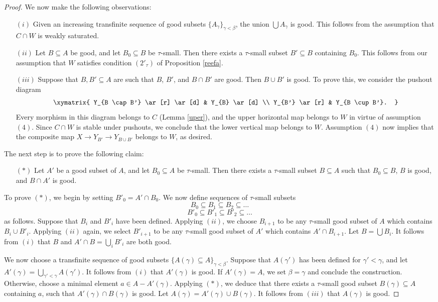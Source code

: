 \begin{Model Categories}
\begin{proof}
We now make the following observations:
\begin{itemize}
\item[$(i)$] Given an increasing transfinite sequence of good subsets $\{ A_{\gamma} \}_{\gamma < \beta}$,
the union $\bigcup A_{\gamma}$ is good. This follows from the assumption that $C \cap W$
is weakly saturated.
\item[$(ii)$] Let $B \subseteq A$ be good, and let $B_0 \subseteq B$ be $\tau$-small. Then there exists a $\tau$-small subset $B' \subseteq B$ containing $B_0$. This follows from our assumption
that $W$ satisfies condition $(2'_{\tau})$ of Proposition \ref{reefa}. 
\item[$(iii)$] Suppose that $B,B' \subseteq A$ are such that $B$, $B'$, and $B \cap B'$ are good.
Then $B \cup B'$ is good. To prove this, we consider the pushout diagram
$$ \xymatrix{ Y_{B \cap B'} \ar[r] \ar[d] & Y_{B} \ar[d] \\
Y_{B'} \ar[r] & Y_{B \cup B'}. }$$
Every morphism in this diagram belongs to $C$ (Lemma \ref{uper}), and the upper horizontal map belongs to $W$ in virtue of assumption $(4)$. Since $C \cap W$ is stable under pushouts, we conclude that the lower vertical map belongs to $W$. Assumption $(4)$ now implies that the composite map $X \rightarrow Y_{B'} \rightarrow Y_{B \cup B'}$ belongs to $W$, as desired.
\end{itemize}

The next step is to prove the following claim:
\begin{itemize}
\item[$(\ast)$] Let $A'$ be a good subset of $A$, and let $B_0 \subseteq A$ be $\tau$-small. Then
there exists a $\tau$-small subset $B \subseteq A$ such that $B_0 \subseteq B$, $B$ is good, and $B \cap A'$ is good.
\end{itemize}

To prove $(\ast)$, we begin by setting $B'_0 = A' \cap B_0$. We now define sequences of $\tau$-small subsets
$$ B_0 \subseteq B_1 \subseteq B_2 \subseteq \ldots $$
$$ B'_0 \subseteq B'_1 \subseteq B'_2 \subseteq \ldots$$
as follows. Suppose that $B_i$ and $B'_{i}$ have been defined. Applying $(ii)$, we choose
$B_{i+1}$ to be any $\tau$-small good subset of $A$ which contains $B_i \cup B'_{i}$.
Applying $(ii)$ again, we select $B'_{i+1}$ to be any $\tau$-small good subset of $A'$ which contains $A' \cap B_{i+1}$. Let $B = \bigcup B_{i}$. It follows from $(i)$ that $B$ and $A' \cap B = \bigcup_{i} B'_{i}$ are both good.

We now choose a transfinite sequence of good subsets $\{ A(\gamma) \subseteq A \}_{\gamma < \beta}$. Suppose that $A(\gamma')$ has been defined for $\gamma' < \gamma$, and let
$A'(\gamma) = \bigcup_{\gamma' < \gamma} A(\gamma')$. It follows from $(i)$ that
$A'(\gamma)$ is good. If $A'(\gamma) = A$, we set $\beta = \gamma$ and conclude the construction. Otherwise, choose a minimal element 
$a \in A - A'(\gamma)$. Applying $(\ast)$, we deduce that there exists a $\tau$-small good subset
$B(\gamma) \subseteq A$ containing $a$, such that $A'(\gamma) \cap B(\gamma)$ is good. Let $A(\gamma) = A'(\gamma) \cup B(\gamma)$. It follows from $(iii)$ that $A(\gamma)$ is good. 


\end{proof}
\end{Model Categories}
